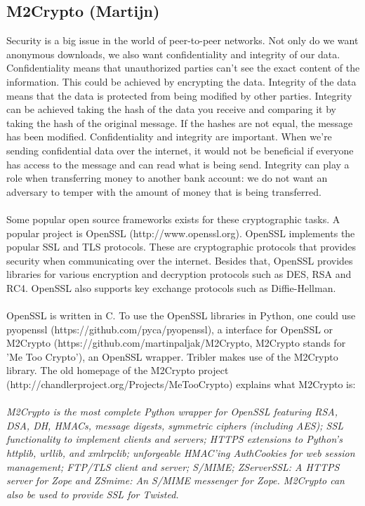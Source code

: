 \documentclass[11pt]{article}
\begin{document}
\subsection{M2Crypto (Martijn)}
Security is a big issue in the world of peer-to-peer networks. Not only do we want anonymous downloads, we also want confidentiality and integrity of our data. Confidentiality means that unauthorized parties can't see the exact content of the information. This could be achieved by encrypting the data. Integrity of the data means that the data is protected from being modified by other parties. Integrity can be achieved taking the hash of the data you receive and comparing it by taking the hash of the original message. If the hashes are not equal, the message has been modified. Confidentiality and integrity are important. When we're sending confidential data over the internet, it would not be beneficial if everyone has access to the message and can read what is being send. Integrity can play a role when transferring money to another bank account: we do not want an adversary to temper with the amount of money that is being transferred.\\\\
Some popular open source frameworks exists for these cryptographic tasks. A popular project is OpenSSL (http://www.openssl.org). OpenSSL implements the popular SSL and TLS protocols. These are cryptographic protocols that provides security when communicating over the internet. Besides that, OpenSSL provides libraries for various encryption and decryption protocols such as DES, RSA and RC4. OpenSSL also supports key exchange protocols such as Diffie-Hellman.\\\\
OpenSSL is written in C. To use the OpenSSL libraries in Python, one could use pyopenssl (https://github.com/pyca/pyopenssl), a interface for OpenSSL or M2Crypto (https://github.com/martinpaljak/M2Crypto, M2Crypto stands for 'Me Too Crypto'), an OpenSSL wrapper. Tribler makes use of the M2Crypto library. The old homepage of the M2Crypto project (http://chandlerproject.org/Projects/MeTooCrypto) explains what M2Crypto is:\\\\
\emph{M2Crypto is the most complete Python wrapper for OpenSSL featuring RSA, DSA, DH, HMACs, message digests, symmetric ciphers (including AES); SSL functionality to implement clients and servers; HTTPS extensions to Python's httplib, urllib, and xmlrpclib; unforgeable HMAC'ing AuthCookies for web session management; FTP/TLS client and server; S/MIME; ZServerSSL: A HTTPS server for Zope and ZSmime: An S/MIME messenger for Zope. M2Crypto can also be used to provide SSL for Twisted.}\\\\
\end{document}
